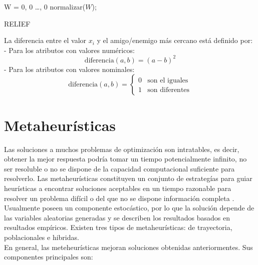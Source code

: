 \documentclass{ci5652}
\begin{document}
\begin{algorithm}
 \DontPrintSemicolon
 \vspace*{0.1cm}
  W = {0, 0 \dots, 0}\;
  normalizar($W$);\;
 \vspace*{0.1cm}
 \caption{RELIEF}
\end{algorithm}

La diferencia entre el valor $x_i$ y el amigo/enemigo más cercano está definido 
por: 
- Para los atributos con valores numéricos:
$$\text{diferencia}(a,b) = {(a - b)}^{2}$$
- Para los atributos con valores nominales:
\[
\text{diferencia}(a,b) = 
  \begin{cases}
    0 & \text{son el iguales}\\
    1 & \text{son diferentes}
  \end{cases} 
\]

\section{Metaheurísticas}

Las soluciones a muchos problemas de optimización son intratables, es decir, obtener la mejor respuesta podría tomar un tiempo potencialmente infinito, no ser resoluble o no se dispone de la capacidad computacional suficiente para resolverlo. Las metaheurísticas constituyen un conjunto de estrategías para guiar heurísticas a encontrar soluciones aceptables en un tiempo razonable para resolver un problema difícil o del que no se dispone información completa \cite{Talbi_2009}. Usualmente poseen un componente estocástico, por lo que la solución depende de las variables aleatorias generadas y se describen los resultados basados en resultados empíricos. Existen tres tipos de metaheurísticas: de trayectoria, poblacionales e hibridas.\\

En general, las meteheurísticas mejoran soluciones obtenidas anteriormentes. Sus componentes principales son:
\end{document}
